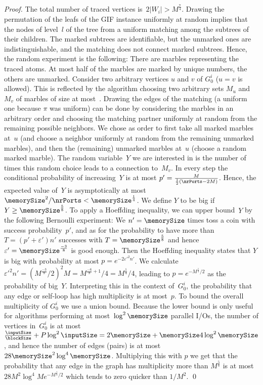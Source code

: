 \documentclass[envcountsame]{llncs}
\begin{document}
\begin{proof}
The total number of traced vertices is~$2|W_i| > M^\frac74$.
Drawing the permutation of the leafs of the GIF instance uniformly at random implies that the nodes of level~$l$ of the tree from a uniform matching among the subtrees of their children.
The marked subtrees are identifiable, but the unmarked ones are indistinguishable, and the matching does not connect marked subtrees.
Hence, the random experiment is the following:
There are marbles representing the traced atoms.
At most half of the marbles are marked by unique numbers, the others are unmarked.
Consider two arbitrary vertices $u$ and $v$ of $G^i_0$ ($u=v$ is allowed). 
This is reflected by the algorithm choosing two arbitrary sets $M_u$ and~$M_v$ of marbles of size at most~\memorySize.
Drawing the edges of the matching (a uniform one because $\pi$ was uniform) can be done by considering the marbles in an arbitrary order and choosing the matching partner uniformly at random from the remaining possible neighbors.
We chose as order to first take all marked marbles at~$u$ (and choose a neighbor uniformly at random from the remaining unmarked marbles), and then the (remaining) unmarked marbles at~$u$ (choose a random marked marble). 
The random variable~$Y$ we are interested in is the number of times this random choice leads to a connection to~$M_v$.
In every step the conditional probability of increasing~$Y$ is at most $p'=\frac{M}{\frac{1}{2}(\nrPorts-2M)}$.
Hence, the expected value of~$Y$ is asymptotically at most~$\memorySize^2/\nrPorts < \memorySize^{\frac{1}{4}}$.
We define $Y$ to be big if $Y\geq \memorySize^{\frac{5}{8}}$.
To apply a Hoeffding inequality, we can upper bound~$Y$ by the following Bernoulli experiment:
We $n'=\memorySize$ times toss a coin with success probability~$p'$, and as for the probability to have more than $T=(p'+\varepsilon')n'$ successes with $T=\memorySize^{\frac{5}{8}}$ and hence $\varepsilon'=\memorySize^{\frac{-3}{8}}$ is good enough. 
Then the Hoeffding inequality states that $Y$ is big with probability at most $p=e^{-2\varepsilon'^2n'}$.
We calculate $\varepsilon'^2n'= (M^\frac{-3}{8}/2)^2M= M^{\frac{-6}{8}+1}/4=M^\frac{1}{4}/4$, leading to $p=e^{-M^\frac{1}{4}/2}$ as the probability of big~$Y$.
Interpreting this in the context of~$G^i_0$, the probability that any edge or self-loop has  high multiplicity is at most~$p$.
To bound the overall multiplicity of $G^i_0$ we use a union bound.
Because the lower bound is only useful for algorithms performing at most~$\log^2 \memorySize$ parallel I/Os, the number of vertices in~$G^i_0$ is at most $\frac{\inputSize}{\blockSize} + P\log^2 \inputSize= 2\memorySize + \memorySize 4\log^2 \memorySize$, and hence the number of edges (pairs) is at most $28 \memorySize^2\log^4 \memorySize$.
Multiplying this with $p$ we get that the probability that any edge in the graph has multiplicity more than $M^\frac58$ is at most $28 M^2\log^4 M e^{-M^\frac{1}{4}/2}$ which tends to zero quicker than $1/M^2$.
\qed
\end{proof}
\end{document}
